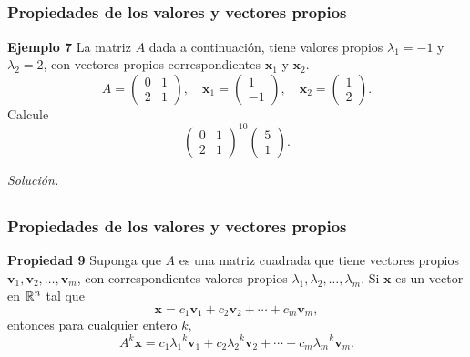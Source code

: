 
\subsection{}

\begin{frame}\frametitle{Propiedades de los valores y vectores propios}
			
	\begin{ej}{\textbf{Ejemplo 7}}\justifying
		La matriz $A$ dada a continuación, tiene valores propios $\lambda_1=-1$ y $\lambda_2=2$, con vectores 
		propios correspondientes $\mathbf{x}_1$ y $\mathbf{x}_2$.
		\[
		A =
		\left(
		\begin{array}{rr}
		0 & 1\\[1mm]		
		2 & 1
		\end{array}
		\right),\quad 
		\mathbf{x}_1 =
		\left(
		\begin{array}{r}
		1\\[1mm]		
		-1
		\end{array}
		\right), \quad 
		\mathbf{x}_2 =
		\left(
		\begin{array}{r}
		1\\[1mm]		
		2
		\end{array}
		\right).
		\]	
		Calcule 
		\[
		\left(
		\begin{array}{rr}
		0 & 1\\[1mm]		
		2 & 1
		\end{array}
		\right)^{10}
		\left(
		\begin{array}{c}
		5\\[1mm]		
		1
		\end{array}
		\right).
		\]
	\end{ej}
	\textit{Solución.}
	
\end{frame}


\subsection{}

\begin{frame}\frametitle{Propiedades de los valores y vectores propios}
	
	\begin{prop}{\textbf{Propiedad 9}}
		\justifying
		Suponga que $A$ es una matriz cuadrada que tiene vectores propios $\mathbf{v}_1 , \mathbf{v}_2 ,\hdots,\mathbf{v}_m$, 
		con correspondientes valores propios $\lambda_1,\lambda_2,\hdots,\lambda_m$. Si $\mathbf{x}$ es un vector en 
		$\mathbb{R}^n$ tal que
		\[
			\mathbf{x} = c_1\mathbf{v}_1 + c_2\mathbf{v}_2 + \cdots + c_m\mathbf{v}_m,
		\]
		entonces para cualquier entero $k$, 
		\[
			A^k\mathbf{x} = c_1{\lambda_1}^k\mathbf{v}_1 + c_2{\lambda_2}^k\mathbf{v}_2 + \cdots + c_m{\lambda_m}^k\mathbf{v}_m.
		\]
	\end{prop}	
	
\end{frame}
